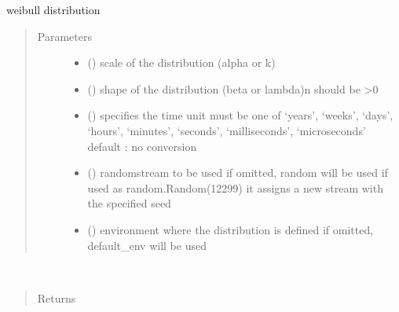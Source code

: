 \documentclass[letterpaper,10pt,english]{sphinxmanual}
\begin{document}

\begin{fulllineitems}
\label{\detokenize{Reference:salabim.Weibull}}
weibull distribution
\begin{quote}\begin{description}
\item[{Parameters}] \leavevmode\begin{itemize}
\item {} 
 () \textendash{} scale of the distribution (alpha or k)

\item {} 
 () \textendash{} shape of the distribution (beta or lambda)\textbar{}n\textbar{}
should be \textgreater{}0

\item {} 
 () \textendash{} specifies the time unit 
must be one of ‘years’, ‘weeks’, ‘days’, ‘hours’, ‘minutes’, ‘seconds’, ‘milliseconds’, ‘microseconds’ 
default : no conversion 

\item {} 
 () \textendash{} randomstream to be used 
if omitted, random will be used 
if used as random.Random(12299)
it assigns a new stream with the specified seed

\item {} 
 ({\hyperref[\detokenize{Reference:salabim.Environment}]{}}) \textendash{} environment where the distribution is defined 
if omitted, default\_env will be used

\end{itemize}

\end{description}\end{quote}

\begin{fulllineitems}
\label{\detokenize{Reference:salabim.Weibull.mean}}~\begin{quote}\begin{description}
\item[{Returns}] \leavevmode
{}


\end{description}
\end{quote}
\end{fulllineitems}
\end{fulllineitems}
\end{document}
